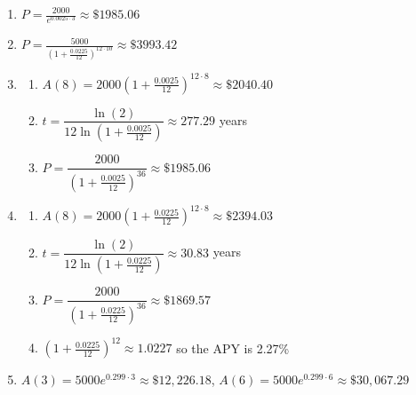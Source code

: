 \documentclass{ximera}
\begin{document}
\begin{enumerate}
\setcounter{enumi}{\value{HW}}

\addtocounter{enumi}{1}

\item  $P = \frac{2000}{e^{0.0025 \cdot 3}} \approx \$ 1985.06$

\item  $P = \frac{5000}{\left(1 + \frac{0.0225}{12}\right)^{12 \cdot 10}} \approx \$ 3993.42$

\item \begin{enumerate}

\item $A(8) = 2000\left(1 + \frac{0.0025}{12}\right)^{12 \cdot 8} \approx \$2040.40$
\item $t = \dfrac{\ln(2)}{12 \ln\left(1 + \frac{0.0025}{12}\right)} \approx 277.29$ years
\item $P = \dfrac{2000}{\left(1 + \frac{0.0025}{12}\right)^{36}} \approx \$1985.06$

\end{enumerate}

\item \begin{enumerate}

\item $A(8) = 2000\left(1 + \frac{0.0225}{12}\right)^{12 \cdot 8} \approx \$2394.03$
\item $t = \dfrac{\ln(2)}{12 \ln\left(1 + \frac{0.0225}{12}\right)} \approx 30.83$ years
\item $P = \dfrac{2000}{\left(1 + \frac{0.0225}{12}\right)^{36}} \approx \$1869.57$
\item $\left(1 + \frac{0.0225}{12}\right)^{12} \approx 1.0227$ so the APY is 2.27\%

\end{enumerate}

\item  $A(3) = 5000e^{0.299 \cdot 3} \approx \$12,226.18$,  $A(6) = 5000e^{0.299 \cdot 6} \approx \$30,067.29$

\setcounter{HW}{\value{enumi}}
\end{enumerate}
\end{document}
